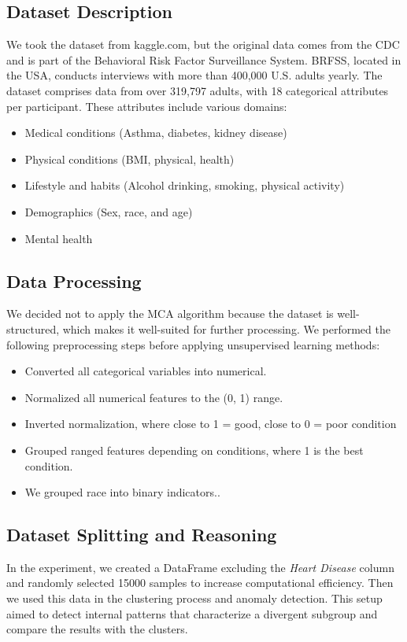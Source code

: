 \documentclass[12pt, a4paper]{article}
\begin{document}
\subsection{Dataset Description}
\hspace*{1em}
	We took the dataset from kaggle.com\citep{Kaggle2020}, but the original data comes from the CDC and is part of the Behavioral Risk Factor Surveillance System. BRFSS, located in the USA, conducts interviews with more than 400,000 U.S. adults yearly. The dataset comprises data from over 319,797 adults, with 18 categorical attributes per participant. These attributes include various domains: 
\begin{itemize}
    \item Medical conditions (Asthma, diabetes, kidney disease)
	\item Physical conditions (BMI, physical, health)
    \item Lifestyle and habits (Alcohol drinking, smoking, physical activity)
    \item Demographics (Sex, race, and age)
    \item Mental health
\end{itemize}

\subsection{Data Processing}
\hspace*{1em}
 	We decided not to apply the MCA algorithm because the dataset is well-structured, which makes it well-suited for further processing. We performed the following preprocessing steps before applying unsupervised learning methods:
\begin{itemize}
    \item Converted all categorical variables into numerical.
    \item Normalized all numerical features to the (0, 1) range.
	\item Inverted normalization, where close to 1 = good, close to 0 = poor condition
	\item Grouped ranged features depending on conditions, where 1 is the best condition.
	\item We grouped race into binary indicators..
\end{itemize}
\subsection{Dataset Splitting and Reasoning}
\hspace*{1em}
In the experiment, we created a DataFrame excluding the \textit{Heart Disease} column and randomly selected 15000 samples to increase computational efficiency. Then we used this data in the clustering process and anomaly detection.  This setup aimed to detect internal patterns that characterize a divergent subgroup and compare the results with the clusters.
\end{document}
